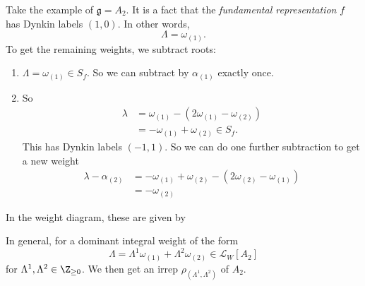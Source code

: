 \documentclass[a4paper]{article}
\begin{document}
\begin{eg}
  Take the example of $\mathfrak{g} = A_2$. It is a fact that the \emph{fundamental representation} $f$ has Dynkin labels $(1, 0)$. In other words,
  \[
    \Lambda = \omega_{(1)}.
  \]
  To get the remaining weights, we subtract roots:
  \begin{enumerate}
    \item $\Lambda = \omega_{(1)} \in S_f$. So we can subtract by $\alpha_{(1)}$ exactly once.
    \item So
      \begin{align*}
        \lambda &= \omega_{(1)} - (2 \omega_{(1)} - \omega_{(2)}) \\
        &= - \omega_{(1)} + \omega_{(2)} \in S_f.
      \end{align*}
      This has Dynkin labels $(-1, 1)$. So we can do one further subtraction to get a new weight
      \begin{align*}
        \lambda - \alpha_{(2)} &= - \omega_{(1)} + \omega_{(2)} - (2 \omega_{(2)} - \omega_{(1)})\\
        &= -\omega_{(2)}
      \end{align*}
  \end{enumerate}
  In the weight diagram, these are given by
  \begin{center}
  \end{center}
  In general, for a dominant integral weight of the form
  \[
    \Lambda = \Lambda^1 \omega_{(1)} + \Lambda^2 \omega_{(2)} \in \mathcal{L}_W[A_2]
  \]
  for $\Lambda^1, \Lambda^2 \in \Z_{\geq 0}$. We then get an irrep $\rho_{(\Lambda^1, \Lambda^2)}$ of $A_2$.


\end{eg}
\end{document}
